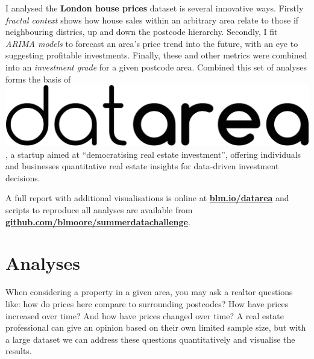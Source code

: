 \documentclass[
10pt, %
a4paper, %
oneside, %
headinclude,footinclude, %
BCOR5mm, %
]{scrartcl}
\newcommand*{\logo}{\includegraphics[scale=.04]{Figures/logotext.png}}
\begin{document}
I analysed the {\bf London house prices} dataset is several innovative
ways. Firstly \emph{fractal context} shows how house sales within an
arbitrary area relate to those if neighbouring districs, up and down
the postcode hierarchy. Secondly, I fit \emph{ARIMA models} to
forecast an area's price trend into the future, with an eye to
suggesting profitable investments. Finally, these and other metrics
were combined into an \emph{investment grade} for a given postcode
area. Combined this set of analyses forms the basis of \logo, a
startup aimed at ``democratising real estate investment'', offering
individuals and businesses quantitative real estate insights for
data-driven investment decisions.

A full report with additional visualisations is online at {\bf
  \leavevmode\href{http://blm.io/datarea}{blm.io/datarea} }and scripts to
reproduce all analyses are available from {\bf
  \leavevmode\href{http://github.com/blmoore/summerdatachallenge}{github.com/blmoore/summerdatachallenge}}.


{\let\thefootnote\relax{}}




\vspace{-1em}
\section*{Analyses}

When considering a property in a given area, you may ask a realtor
questions like: how do prices here compare to surrounding postcodes?
How have prices increased over time? And how have prices changed over
time? A real estate professional can give an opinion based on their
own limited sample size, but with a large dataset we can address these
questions quantitatively and visualise the results.
\end{document}
